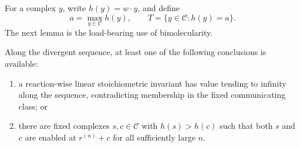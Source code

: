 For a complex \(y\), write \(h(y)=w\cdot y\), and define
\begin{equation}\label{eq:top}
  a=\max_{y\in\mathcal C}h(y),
  \qquad
  T=\{y\in\mathcal C:h(y)=a\}.
\end{equation}
The next lemma is the load-bearing use of bimolecularity.

\begin{lemma}\label{lem:top}
Along the divergent sequence, at least one of the following conclusions is
available:

\begin{enumerate}[label=\textup{(\roman*)},leftmargin=2.5em]
\item a reaction-wise linear stoichiometric invariant has value tending to
      infinity along the sequence, contradicting membership in the fixed
      communicating class; or
\item there are fixed complexes \(s,c\in\mathcal C\) with
      \(h(s)>h(c)\) such that both \(s\) and \(c\) are enabled at
      \(r^{(n)}+c\) for all sufficiently large \(n\).
\end{enumerate}
\end{lemma}

